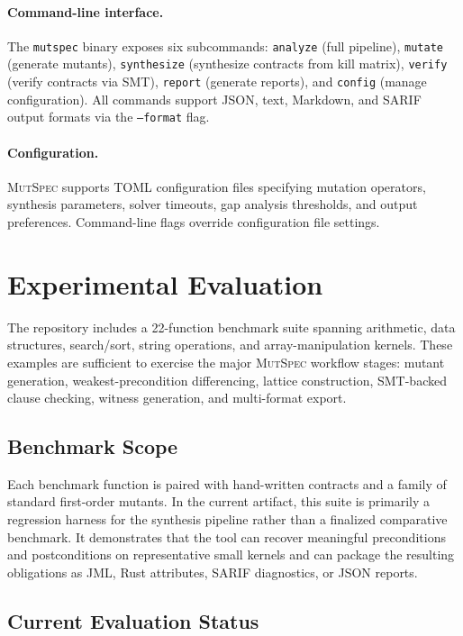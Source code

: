 \documentclass[11pt]{article}
\begin{document}
\paragraph{Command-line interface.} The \texttt{mutspec} binary exposes six
subcommands: \texttt{analyze} (full pipeline), \texttt{mutate} (generate
mutants), \texttt{synthesize} (synthesize contracts from kill matrix),
\texttt{verify} (verify contracts via SMT), \texttt{report} (generate reports),
and \texttt{config} (manage configuration). All commands support JSON, text,
Markdown, and SARIF output formats via the \texttt{--format} flag.

\paragraph{Configuration.} \textsc{MutSpec} supports TOML configuration files
specifying mutation operators, synthesis parameters, solver timeouts, gap
analysis thresholds, and output preferences. Command-line flags override
configuration file settings.

\section{Experimental Evaluation}
\label{sec:evaluation}

The repository includes a 22-function benchmark suite spanning arithmetic, data structures, search/sort, string operations, and array-manipulation kernels. These examples are sufficient to exercise the major \textsc{MutSpec} workflow stages: mutant generation, weakest-precondition differencing, lattice construction, SMT-backed clause checking, witness generation, and multi-format export.

\subsection{Benchmark Scope}

Each benchmark function is paired with hand-written contracts and a family of standard first-order mutants. In the current artifact, this suite is primarily a regression harness for the synthesis pipeline rather than a finalized comparative benchmark. It demonstrates that the tool can recover meaningful preconditions and postconditions on representative small kernels and can package the resulting obligations as JML, Rust attributes, SARIF diagnostics, or JSON reports.

\subsection{Current Evaluation Status}
\end{document}
